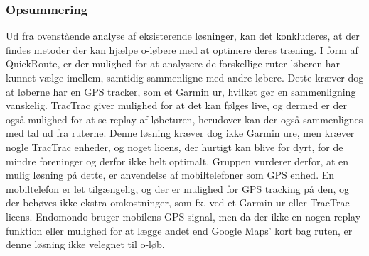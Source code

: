 \subsubsection{Opsummering}
Ud fra ovenstående analyse af eksisterende løsninger, kan det konkluderes, at der findes metoder der kan hjælpe o-løbere med at optimere deres træning. I form af QuickRoute, er der mulighed for at analysere de forskellige ruter løberen har kunnet vælge imellem, samtidig sammenligne med andre løbere. Dette kræver dog at løberne har en GPS tracker, som et Garmin ur, hvilket gør en sammenligning vanskelig. TracTrac giver mulighed for at det kan følges live, og dermed er der også mulighed for at se replay af løbeturen, herudover kan der også sammenlignes med tal ud fra ruterne. Denne løsning kræver dog ikke Garmin ure, men kræver nogle TracTrac enheder, og noget licens, der hurtigt kan blive for dyrt, for de mindre foreninger og derfor ikke helt optimalt. 
Gruppen vurderer derfor, at en mulig løsning på dette, er anvendelse af mobiltelefoner som GPS enhed. En mobiltelefon er let tilgængelig, og der er mulighed for GPS tracking på den, og der behøves ikke ekstra omkostninger, som fx. ved et Garmin ur eller TracTrac licens. Endomondo bruger mobilens GPS signal, men da der ikke en nogen replay funktion eller mulighed for at lægge andet end Google Maps' kort bag ruten, er denne løsning ikke velegnet til o-løb. 